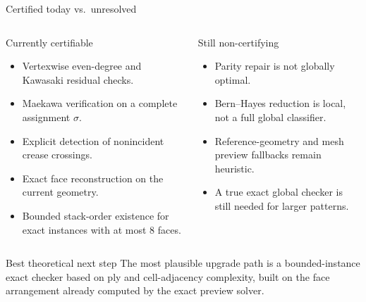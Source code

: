 \documentclass[aspectratio=169,10pt]{beamer}
\begin{document}
\begin{frame}{Certified today vs.\ unresolved}
\begin{columns}[T,onlytextwidth]
\begin{block}{Currently certifiable}
\begin{itemize}\small
  \item Vertexwise even-degree and Kawasaki residual checks.
  \item Maekawa verification on a complete assignment \(\sigma\).
  \item Explicit detection of nonincident crease crossings.
  \item Exact face reconstruction on the current geometry.
  \item Bounded stack-order existence for exact instances with at most \(8\) faces.
\end{itemize}
\end{block}

\begin{block}{Still non-certifying}
\begin{itemize}\small
  \item Parity repair is not globally optimal.
  \item Bern--Hayes reduction is local, not a full global classifier.
  \item Reference-geometry and mesh preview fallbacks remain heuristic.
  \item A true exact global checker is still needed for larger patterns.
\end{itemize}
\end{block}
\end{columns}

\begin{alertblock}{Best theoretical next step}
\footnotesize The most plausible upgrade path is a bounded-instance exact checker based on ply and cell-adjacency complexity, built on the face arrangement already computed by the exact preview solver. \textcolor{cpmid}{\cite{eppstein_flat}}
\end{alertblock}
\end{frame}
\end{document}
